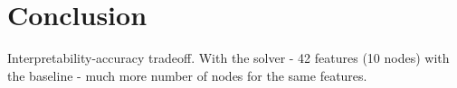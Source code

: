 \documentclass[msthesis.tex]{subfiles}
\begin{document}
\chapter{Conclusion}
Interpretability-accuracy tradeoff. 
With the solver - 42 features (10 nodes)
with the baseline - much more number of nodes for the same features.
\end{document}
